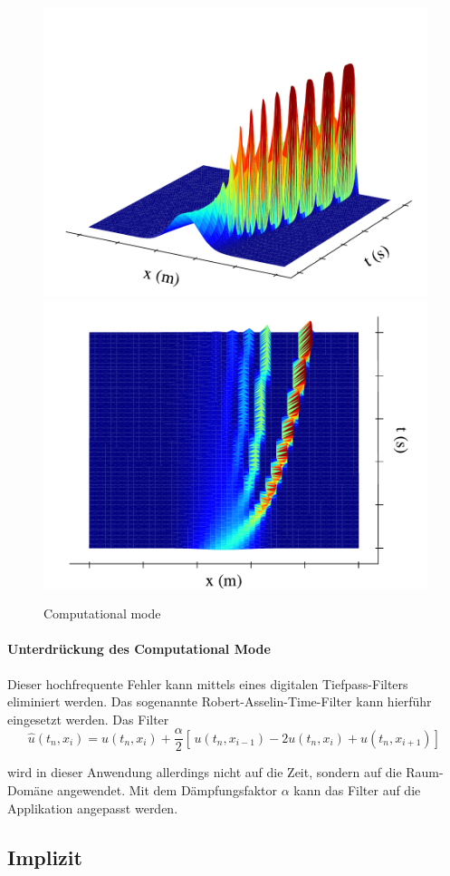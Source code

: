     \begin{figure}
	\centering
	\includegraphics[width=.49\textwidth]{papers/burgers/BurgersEquation/images/Leap_Frog_front.pdf}
	\includegraphics[width=.49\textwidth]{papers/burgers/BurgersEquation/images/Leap_Frog_top.pdf}
	\caption{Computational mode}
	\label{burgers:fig:cm1}
	\end{figure}

	\paragraph{Unterdrückung des Computational Mode}
	\label{burgers:sec:cm}

	Dieser hochfrequente Fehler kann mittels eines digitalen Tiefpass-Filters eliminiert werden.
	Das sogenannte Robert-Asselin-Time-Filter \cite{burgers:time_filter} kann hierf\"uhr eingesetzt werden.
	Das Filter
		\begin{equation}
			\hat{u}(t_n,x_i) = u(t_n,x_i)+ \frac{\alpha}{2} [ \, u(t_n,x_{i-1}) - 2u(t_n,x_i)+u(t_n,x_{i+1}) ] \,
		\end{equation}

	wird in dieser Anwendung allerdings nicht auf die Zeit, sondern auf die Raum-Dom\"ane angewendet.
	Mit dem D\"ampfungsfaktor $\alpha$ kann das Filter auf die Applikation angepasst werden.

\subsection{Implizit}

